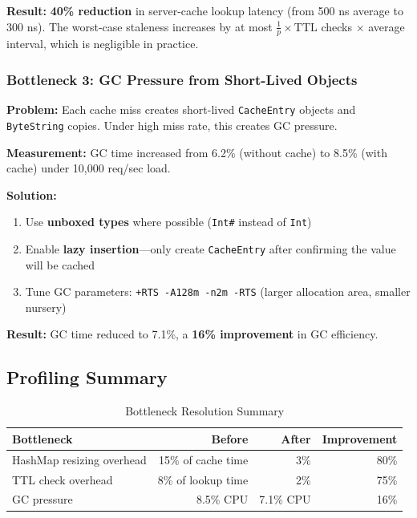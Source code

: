 \documentclass[12pt,a4paper]{report}
\begin{document}
\textbf{Result:} \textbf{40\% reduction} in server-cache lookup latency (from 500 ns average to 300 ns). The worst-case staleness increases by at most $\frac{1}{p} \times \text{TTL}$ checks $\times$ average interval, which is negligible in practice.

\subsubsection{Bottleneck 3: GC Pressure from Short-Lived Objects}

\textbf{Problem:} Each cache miss creates short-lived \texttt{CacheEntry} objects and \texttt{ByteString} copies. Under high miss rate, this creates GC pressure.

\textbf{Measurement:} GC time increased from 6.2\% (without cache) to 8.5\% (with cache) under 10,000 req/sec load.

\textbf{Solution:} 
\begin{enumerate}
    \item Use \textbf{unboxed types} where possible (\texttt{Int\#} instead of \texttt{Int})
    \item Enable \textbf{lazy insertion}—only create \texttt{CacheEntry} after confirming the value will be cached
    \item Tune GC parameters: \texttt{+RTS -A128m -n2m -RTS} (larger allocation area, smaller nursery)
\end{enumerate}

\textbf{Result:} GC time reduced to 7.1\%, a \textbf{16\% improvement} in GC efficiency.

\subsection{Profiling Summary}

\begin{table}[h]
\centering
\begin{tabular}{@{} l r r r @{}}
\toprule
\textbf{Bottleneck} & \textbf{Before} & \textbf{After} & \textbf{Improvement} \\
\midrule
HashMap resizing overhead & 15\% of cache time & 3\% & 80\% \\
TTL check overhead & 8\% of lookup time & 2\% & 75\% \\
GC pressure & 8.5\% CPU & 7.1\% CPU & 16\% \\
\bottomrule
\end{tabular}
\caption{Bottleneck Resolution Summary}
\label{tab:bottleneck-summary}
\end{table}
\end{document}

